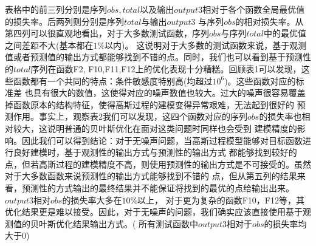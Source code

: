 \documentclass[a4paper,10pt]{article}
\begin{document}
表格中的前三列分别是序列$obs,total$以及输出$output3$相对于各个函数全局最优值的损失率。后两列则分别是序列$total$与输出$output3$
与序列$obs$的相对损失率。从第四列可以很直观地看出，对于大多数测试函数，序列$obs$与序列$total$中的最优值之间差距不大(基本都在$1\%$以内)。
这说明对于大多数的测试函数来说，基于观测值或者预测值的输出方式都能够找到不错的点。同时，我们也可以看到基于预测性的$total$序列在函数F2,
F10,F11,F12上的优化表现十分糟糕。回顾表1可以发现，这些函数都有一个共同的特点：条件敏感度特别高(均超过$10^6$)。这些函数对应的标准差
也具有很大的数值，这使得对应的噪声数值也较大。过大的噪声很容易覆盖掉函数原本的结构特征，使得高斯过程的建模变得异常艰难，无法起到很好的
预测作用。事实上，观察表2我们可以发现，这四个函数对应的序列$obs$的损失率也相对较大，这说明普通的贝叶斯优化在面对这类问题时同样也会受到
建模精度的影响。因此我们可以得到结论：对于无噪声问题，当高斯过程模型能够对目标函数进行良好建模时，基于观测性的输出方式与预测性的输出方式
都能够找到较好的点，但若高斯过程的建模精度不高，则使用预测性的输出方式是不可接受的。虽然对于大多数函数来说预测性的输出方式能够找到不错的
点，但从第五列的结果来看，预测性的方式输出的最终结果并不能保证将找到的最优的点给输出出来。$output3$相对$obs$的损失率大多在$10\%$以上，
对于更为复杂的函数F10，F12等，其优化结果更是难以接受。因此，对于无噪声的问题，我们确实应该直接使用基于观测值的贝叶斯优化结果输出方式。(
  所有测试函数中$output3$相对于$obs$的损失率均大于0)

\medskip


\end{document}
